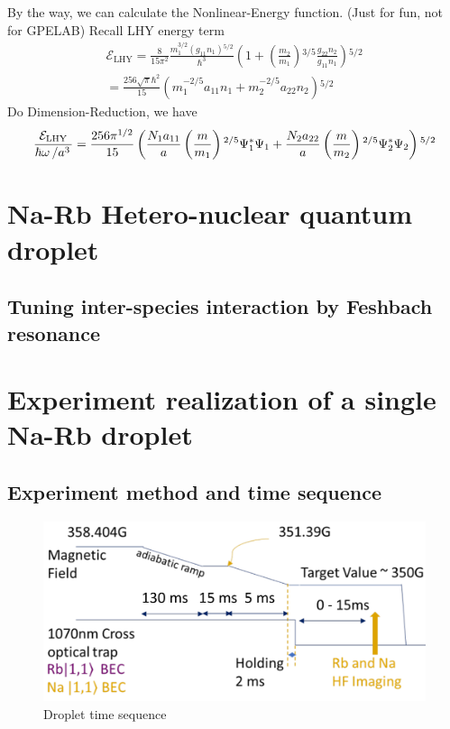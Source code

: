 By the way, we can calculate the Nonlinear-Energy function. (Just for fun, not for GPELAB)
Recall LHY energy term
\begin{equation}
\begin{split}
\mathcal{E}_{\text{LHY}}=\frac{8}{15\pi ^2}\frac{m_1^{3/2}\left(g_{11}n_1\right){}^{5/2}}{\hbar ^3}\left(1+\left(\frac{m_2}{m_1}\right){}^{3/5}\frac{g_{22}n_2}{g_{11}n_1}\right){}^{5/2}\\
=\frac{256\sqrt{\pi }\hbar ^2}{15}\left(m_1^{-2/5}a_{11}n_1+m_2^{-2/5}a_{22}n_2\right){}^{5/2}
\end{split}
\end{equation}
Do Dimension-Reduction, we have
\begin{equation}
\frac{\mathcal{E}_{\text{LHY}}}{\hbar\omega\left/a^3\right.}=\frac{256\pi^{1/2}}{15}\left(\frac{N_1a_{11}}{a}\left(\frac{m}{m_1}\right){}^{2/5}\Psi_1^*\Psi_1+\frac{N_2a_{22}}{a}\left(\frac{m}{m_2}\right){}^{2/5}\Psi _2^*\Psi _2\right){}^{5/2}
\end{equation}

\section{Na-Rb Hetero-nuclear quantum droplet}
\subsection{Tuning inter-species interaction by Feshbach resonance}

\section{Experiment realization of a single Na-Rb droplet}
\subsection{Experiment method and time sequence}

\begin{figure}[hb]
\begin{center}
\includegraphics[width = 0.8\linewidth]{figures/Droplet_time-sequence.pdf}
\end{center}
\caption{Droplet time sequence}
\label{Droplet_time-sequence}
\end{figure}

